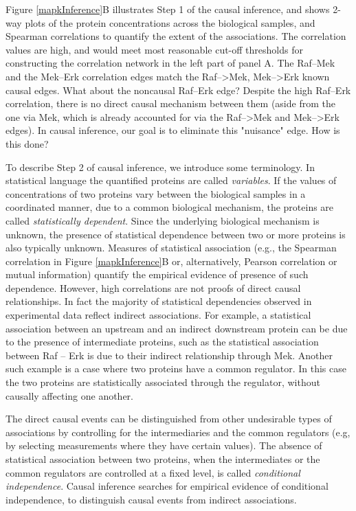 \documentclass[journal=jacsat,manuscript=article]{achemso}
\begin{document}
Figure \ref{mapkInference}B illustrates Step 1 of the causal inference, and shows 2-way plots of the protein concentrations across the biological samples, and Spearman correlations to quantify the extent of the associations.  The correlation values are high, and would meet most reasonable cut-off thresholds for constructing the correlation network in the left part of panel A.  The Raf--Mek and the Mek--Erk correlation edges match the Raf-->Mek, Mek-->Erk known causal edges.  What about the noncausal Raf--Erk edge? Despite the high Raf--Erk correlation, there is no direct causal mechanism between them (aside from the one via Mek, which is already accounted for via the Raf-->Mek and Mek-->Erk edges).  In causal  inference, our goal is to eliminate this "nuisance" edge.  How is this done?

To describe Step 2 of causal inference, we introduce some terminology. In statistical language the quantified proteins are called {\it variables}. If the values of concentrations of two proteins vary between the biological samples in a coordinated manner, due to a common biological mechanism, the proteins are called {\it statistically dependent}.  Since the underlying biological mechanism is unknown, the presence of statistical dependence between two or more proteins is also typically unknown. Measures of statistical association (e.g.,  the Spearman correlation in Figure \ref{mapkInference}B or, alternatively, Pearson correlation or mutual information) quantify the empirical evidence of presence of such dependence. However, high correlations are not proofs of direct causal relationships. In fact the majority of statistical dependencies observed in experimental data reflect indirect associations. For example, a statistical association between an upstream and an indirect downstream protein can be due to the presence of intermediate proteins, such as the statistical association between Raf -- Erk is due to their indirect relationship through Mek. Another such example is a case where two proteins have a common regulator. In this case the two proteins are statistically associated through the regulator, without causally affecting one another. 

The direct causal events can be distinguished from other undesirable types of associations by controlling for the intermediaries and the common regulators (e.g, by selecting measurements where they have certain values). The absence of statistical association between two proteins, when the intermediates or the common regulators are controlled at a fixed level, is called {\it conditional independence}.  Causal inference searches for empirical evidence of conditional independence, to distinguish causal events from indirect associations. 
\end{document}
